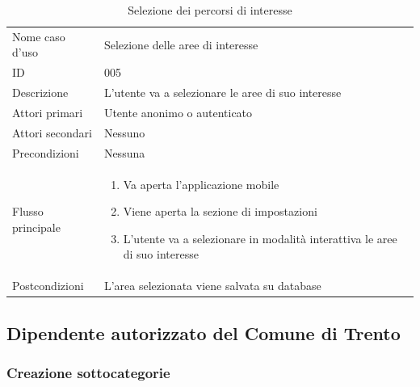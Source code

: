 \documentclass{article}
\begin{document}
\begin{table}[htbp]
    \label{8.2.5}
    \centering
    \begin{tabularx}{\textwidth}{| l | p{} |}
        \Xhline{2pt} %
        Nome caso d'uso & Selezione delle aree di interesse \\
        \Xhline{2pt} %
        ID & 005 \\
        \hline
        Descrizione & L'utente va a selezionare le aree di suo interesse\\
        \hline
        Attori primari & Utente anonimo o autenticato\\
        \hline
        Attori secondari & Nessuno \\
        \hline
        Precondizioni & Nessuna \\
        \hline
        Flusso principale & 
        \begin{enumerate}[topsep=5pt,partopsep=0pt,parsep=0pt,itemsep=0pt,before=\vspace{-\baselineskip},after=\vspace{-\baselineskip}]                
            \item Va aperta l'applicazione mobile
            \item Viene aperta la sezione di impostazioni
            \item L'utente va a selezionare in modalità interattiva le aree di suo interesse
        \end{enumerate}
        \\
        \hline
        Postcondizioni & L'area selezionata viene salvata su database \\
        \hline
    \end{tabularx}
    \caption{Selezione dei percorsi di interesse}
    \label{tab:tabella_use_case004}
\end{table}



\subsection{Dipendente autorizzato del Comune di Trento}

\subsubsection{Creazione sottocategorie}
\end{document}
